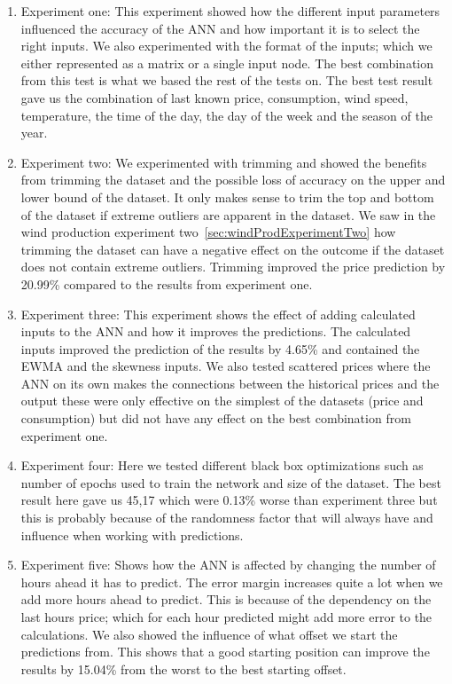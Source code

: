 \begin{enumerate}
	\item Experiment one: This experiment showed how the different input parameters influenced the accuracy of the ANN and how important it is to select the right inputs. We also experimented with the format of the inputs; which we either represented as a matrix or a single input node. The best combination from this test is what we based the rest of the tests on. The best test result gave us the combination of last known price, consumption, wind speed, temperature, the time of the day, the day of the week and the season of the year.
	\item Experiment two: We experimented with trimming and showed the benefits from trimming the dataset and the possible loss of accuracy on the upper and lower bound of the dataset. It only makes sense to trim the top and bottom of the dataset if extreme outliers are apparent in the dataset. We saw in the wind production experiment two~\ref{sec:windProdExperimentTwo} how trimming the dataset can have a negative effect on the outcome if the dataset does not contain extreme outliers. Trimming improved the price prediction by 20.99\% compared to the results from experiment one.
	\item Experiment three: This experiment shows the effect of adding calculated inputs to the ANN and how it improves the predictions. The calculated inputs improved the prediction of the results by 4.65\% and contained the EWMA and the skewness inputs. We also tested scattered prices where the ANN on its own makes the connections between the historical prices and the output these were only effective on the simplest of the datasets (price and consumption) but did not have any effect on the best combination from experiment one.
	\item Experiment four: Here we tested different black box optimizations such as number of epochs used to train the network and size of the dataset. The best result here gave us 45,17 which were 0.13\% worse than experiment three but this is probably because of the randomness factor that will always have and influence when working with predictions.
	\item Experiment five: Shows how the ANN is affected by changing the number of hours ahead it has to predict. The error margin increases quite a lot when we add more hours ahead to predict. This is because of the dependency on the last hours price; which for each hour predicted might add more error to the calculations. We also showed the influence of what offset we start the predictions from. This shows that a good starting position can improve the results by 15.04\% from the worst to the best starting offset.
\end{enumerate}